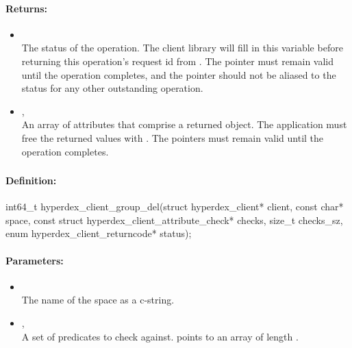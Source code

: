 \paragraph{Returns:}
\begin{itemize}[noitemsep]
\item {}\\
The status of the operation.  The client library will fill in this variable before returning this operation's request id from .  The pointer must remain valid until the operation completes, and the pointer should not be aliased to the status for any other outstanding operation.
\item {}, \\
An array of attributes that comprise a returned object.  The application must free the returned values with .  The pointers must remain valid until the operation completes.
\end{itemize}

\pagebreak
\subsubsection{}
\label{api:c:group_del}


\paragraph{Definition:}
\begin{ccode}
int64_t hyperdex_client_group_del(struct hyperdex_client* client,
        const char* space,
        const struct hyperdex_client_attribute_check* checks, size_t checks_sz,
        enum hyperdex_client_returncode* status);
\end{ccode}

\paragraph{Parameters:}
\begin{itemize}[noitemsep]
\item {}\\
The name of the space as a c-string.
\item {}, \\
A set of predicates to check against.   points to an array of length .
\end{itemize}

